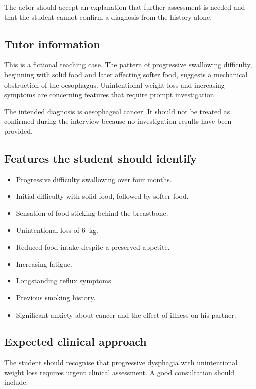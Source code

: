 The actor should accept an explanation that further assessment is
needed and that the student cannot confirm a diagnosis from the history
alone.

\clearpage

\subsection*{Tutor information}

This is a fictional teaching case. The pattern of progressive
swallowing difficulty, beginning with solid food and later affecting
softer food, suggests a mechanical obstruction of the oesophagus.
Unintentional weight loss and increasing symptoms are concerning
features that require prompt investigation.

The intended diagnosis is oesophageal cancer. It should not be treated
as confirmed during the interview because no investigation results
have been provided.

\subsection*{Features the student should identify}

\begin{itemize}
    \item Progressive difficulty swallowing over four months.
    \item Initial difficulty with solid food, followed by softer food.
    \item Sensation of food sticking behind the breastbone.
    \item Unintentional loss of \SI{6}{\kilogram}.
    \item Reduced food intake despite a preserved appetite.
    \item Increasing fatigue.
    \item Longstanding reflux symptoms.
    \item Previous smoking history.
    \item Significant anxiety about cancer and the effect of illness on
    his partner.
\end{itemize}

\subsection*{Expected clinical approach}

The student should recognise that progressive dysphagia with
unintentional weight loss requires urgent clinical assessment. A good
consultation should include:

